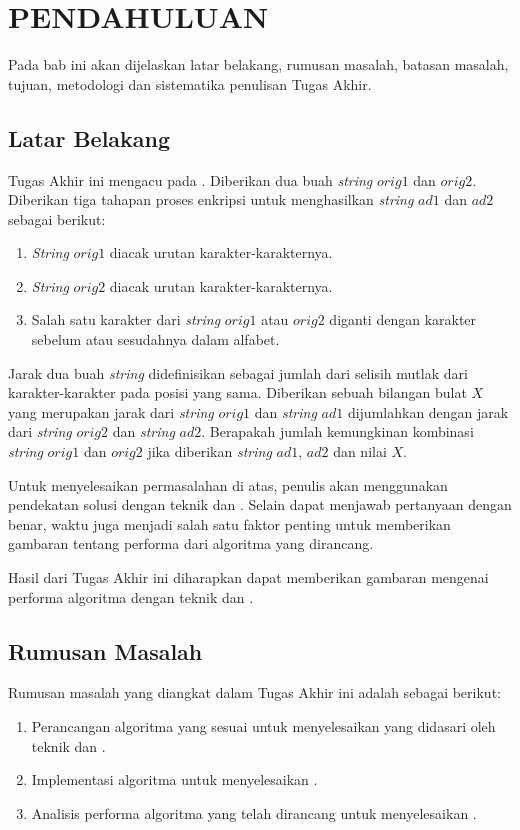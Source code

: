 \chapter{PENDAHULUAN}
Pada bab ini akan dijelaskan latar belakang, rumusan masalah, batasan masalah, tujuan, metodologi dan sistematika penulisan Tugas Akhir.

\section{Latar Belakang}

Tugas Akhir ini mengacu pada \problem. Diberikan dua buah \textit{string} $orig1$ dan $orig2$. Diberikan tiga tahapan proses enkripsi untuk menghasilkan \textit{string} $ad1$ dan $ad2$ sebagai berikut:

\begin{enumerate}
	\item \textit{String} $orig1$ diacak urutan karakter-karakternya.
	\item \textit{String} $orig2$ diacak urutan karakter-karakternya.
	\item Salah satu karakter dari \textit{string} $orig1$ atau $orig2$ diganti dengan karakter sebelum atau sesudahnya dalam alfabet.
\end{enumerate}	

Jarak dua buah \textit{string} didefinisikan sebagai jumlah dari selisih mutlak dari karakter-karakter pada posisi yang sama. Diberikan sebuah bilangan bulat $X$ yang merupakan jarak dari \textit{string} $orig1$ dan \textit{string} $ad1$ dijumlahkan dengan jarak dari \textit{string} $orig2$ dan \textit{string} $ad2$. Berapakah jumlah kemungkinan kombinasi \textit{string} $orig1$ dan $orig2$ jika diberikan \textit{string} $ad1$, $ad2$ dan nilai $X$.

Untuk menyelesaikan permasalahan di atas, penulis akan menggunakan pendekatan solusi dengan teknik \dynamicprogramming{} dan \meetinthemiddle{}. Selain dapat menjawab pertanyaan dengan benar, waktu juga menjadi salah satu faktor penting untuk memberikan gambaran tentang performa dari algoritma yang dirancang.

Hasil dari Tugas Akhir ini diharapkan dapat memberikan gambaran mengenai performa algoritma dengan teknik \dynamicprogramming{} dan \meetinthemiddle{}.	 

\section{Rumusan Masalah}
Rumusan masalah yang diangkat dalam Tugas Akhir ini adalah sebagai berikut:
\begin{enumerate}
	\item Perancangan algoritma yang sesuai untuk menyelesaikan \problem{} yang didasari oleh teknik \dynamicprogramming{} dan \meetinthemiddle{}.
	\item Implementasi algoritma untuk menyelesaikan \problem.
	\item Analisis performa algoritma yang telah dirancang untuk menyelesaikan \problem.
\end{enumerate}

